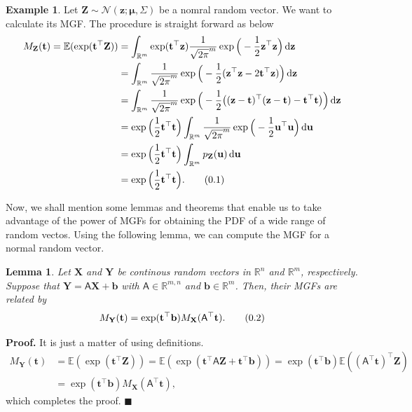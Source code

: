 \documentclass[10pt]{article}
\newtheorem{lem}[thm]{Lemma}
\theoremstyle{definition}
\newtheorem{exmp}{Example}[section]
\newenvironment{prf}{\noindent\textbf{Proof.}}{\hfill$\blacksquare$}
\newcommand\eqnum{\addtocounter{equation}{1}\tag{\arabic{section}.\arabic{equation}}}
\DeclareMathOperator{\df}{d\!}
\begin{document}
\begin{exmp}
Let $\mathbf{Z}\sim\mathcal{N}(\mathbf{z}; \boldsymbol{\mu}, \mathsf{\Sigma})$ be a nomral random vector. We want to calculate its MGF. The procedure is straight forward as below
\begin{align*}
M_{\mathbf{Z}}(\mathbf{t}) = \mathbb{E}(\exp(\mathbf{t}^{\top}\mathbf{Z})) 
&= \int_{\mathbb{R}^m}\exp(\mathbf{t}^{\top}\mathbf{z})\frac{1}{\sqrt{2\pi}^m}\exp\Big(-\frac{1}{2}\mathbf{z}^{\top}\mathbf{z}\Big)\df \mathbf{z} \\
&= \int_{\mathbb{R}^m}\frac{1}{\sqrt{2\pi}^m}\exp\Big(-\frac{1}{2}(\mathbf{z}^{\top}\mathbf{z}-2\mathbf{t}^{\top}\mathbf{z})\Big)\df \mathbf{z} \\
&= \int_{\mathbb{R}^m}\frac{1}{\sqrt{2\pi}^m}\exp\Big(-\frac{1}{2}\big((\mathbf{z}-\mathbf{t})^{\top}(\mathbf{z}-\mathbf{t})-\mathbf{t}^{\top}\mathbf{t}\big)\Big)\df \mathbf{z} \\
&= \exp\Big(\frac{1}{2}\mathbf{t}^{\top}\mathbf{t}\Big)\int_{\mathbb{R}^m}\frac{1}{\sqrt{2\pi}^m}\exp\Big(-\frac{1}{2}\mathbf{u}^{\top}\mathbf{u}\Big)\df \mathbf{u} \\
&= \exp\Big(\frac{1}{2}\mathbf{t}^{\top}\mathbf{t}\Big)\int_{\mathbb{R}^m}p_{\mathbf{Z}}(\mathbf{u})\df \mathbf{u} \\
&= \exp\Big(\frac{1}{2}\mathbf{t}^{\top}\mathbf{t}\Big).
\eqnum
\label{eq:MGF:SN}
\end{align*}
\end{exmp}
Now, we shall mention some lemmas and theorems that enable us to take advantage of the power of MGFs for obtaining the PDF of a wide range of random vectos. Using the following lemma, we can compute the MGF for a normal random vector. 
\begin{lem}\label{lem:MGF:lin}
Let $\mathbf{X}$ and $\mathbf{Y}$ be continous random vectors in $\mathbb{R}^n$ and  $\mathbb{R}^m$, respectively. Suppose that $\mathbf{Y} = \mathsf{A} \mathbf{X} + \mathbf{b} $ with $\mathsf{A}\in\mathbb{R}^{m,n}$ and $\mathbf{b}\in\mathbb{R}^m$. Then, their MGFs are related by
\begin{equation*}
M_{\mathbf{Y}}(\mathbf{t}) = \exp(\mathbf{t}^{\top}\mathbf{b}) M_{\mathbf{X}}(\mathsf{A}^{\top}\mathbf{t}).
\eqnum
\label{eq:MGF:lin}
\end{equation*}
\end{lem}
\begin{prf}
It is just a matter of using definitions.
\begin{align*}
M_{\mathbf{Y}}(\mathbf{t}) &= \mathbb{E}(\exp(\mathbf{t}^{\top}\mathbf{Z}))
= \mathbb{E}(\exp(\mathbf{t}^{\top}\mathsf{A}\mathbf{Z}+\mathbf{t}^{\top}\mathbf{b}))
=\exp(\mathbf{t}^{\top}\mathbf{b})\mathbb{E}((\mathsf{A}^{\top}\mathbf{t})^{\top}\mathbf{Z}) \\
&= \exp(\mathbf{t}^{\top}\mathbf{b})M_{\mathbf{X}}(\mathsf{A}^{\top}\mathbf{t}),
\end{align*}
which completes the proof.
\end{prf}
\end{document}
